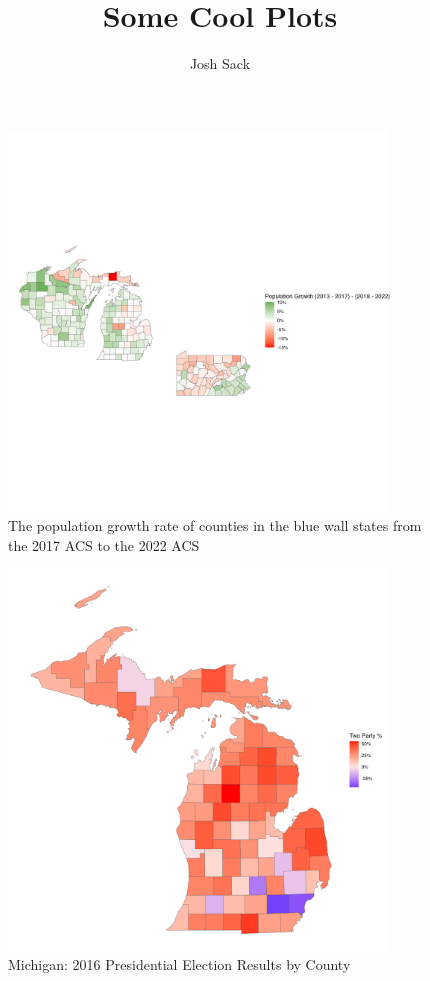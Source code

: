 \documentclass[11pt]{article}
\title{Some Cool Plots}
\author{Josh Sack}
\begin{document}
\maketitle 
\listoffigures
\listoftables
\begin{figure}
    \centering
    \includegraphics[width=0.9\textwidth]{plots/blue-wall-growth.png}
    \caption{The population growth rate of counties in the blue wall states from the 2017 ACS to the 2022 ACS}
\end{figure}
\begin{figure}
    \centering 
    \includegraphics[width=0.9\textwidth]{plots/county-results.png}
    \caption{Michigan: 2016 Presidential Election Results by County}
    \label{fig:2016-results}
\end{figure}
\end{document}

